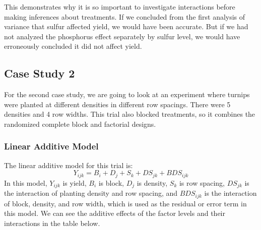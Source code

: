 \documentclass[
]{book}
\begin{document}
This demonstrates why it is so important to investigate interactions before making inferences about treatments. If we concluded from the first analysis of variance that sulfur affected yield, we would have been accurate. But if we had not analyzed the phosphorus effect separately by sulfur level, we would have erroneously concluded it did not affect yield.

\hypertarget{case-study-2-1}{%
\subsection{Case Study 2}\label{case-study-2-1}}

For the second case study, we are going to look at an experiment where turnips were planted at different densities in different row spacings. There were 5 densities and 4 row widths. This trial also blocked treatments, so it combines the randomized complete block and factorial designs.

\hypertarget{linear-additive-model-2}{%
\subsubsection{Linear Additive Model}\label{linear-additive-model-2}}

The linear additive model for this trial is:
\[Y_{ijk} =  B_i + D_j + S_k + DS_{jk} + BDS_{ijk}\]
In this model, \(Y_{ijk}\) is yield, \(B_i\) is block, \(D_j\) is density, \(S_k\) is row spacing, \(DS_{jk}\) is the interaction of planting density and row spacing, and \(BDS_{ijk}\) is the interaction of block, density, and row width, which is used as the residual or error term in this model. We can see the additive effects of the factor levels and their interactions in the table below.
\end{document}
